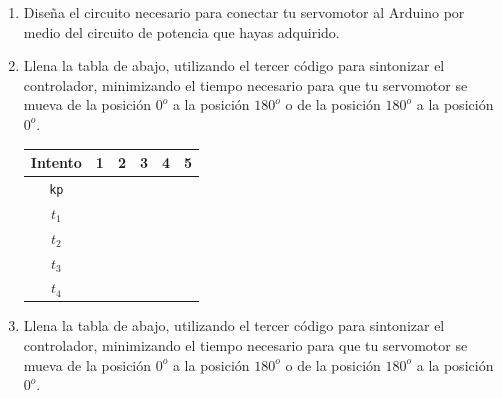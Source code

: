\begin{enumerate}
		\item Diseña el circuito necesario para conectar tu servomotor al Arduino por medio del circuito de potencia que hayas adquirido. \\ \vspace{3cm}

		\item Llena la tabla de abajo, utilizando el tercer código para sintonizar el controlador, minimizando el tiempo necesario para que tu servomotor se mueva de la posición $0^o$ a la posición $180^o$ o de la posición $180^o$ a la posición $0^o$.

		\begin{center}
			\begin{tabular}{|c|c|c|c|c|c|}
				 \hline
				 Intento & 1 & 2 & 3 & 4 & 5 \\
				 \hline
				 \texttt{kp} & \hspace{1.7cm} & \hspace{1.7cm} & \hspace{1.7cm} & \hspace{1.7cm} & \hspace{1.7cm} \\
				 \hline
				 $t_1$ & & & & & \\
				 \hline
				 $t_2$ & & & & & \\
				 \hline
				 $t_3$ & & & & & \\
				 \hline
				 $t_4$ & & & & & \\
				 \hline
			\end{tabular}
		\end{center}

		\item Llena la tabla de abajo, utilizando el tercer código para sintonizar el controlador, minimizando el tiempo necesario para que tu servomotor se mueva de la posición $0^o$ a la posición $180^o$ o de la posición $180^o$ a la posición $0^o$.


\end{enumerate}
